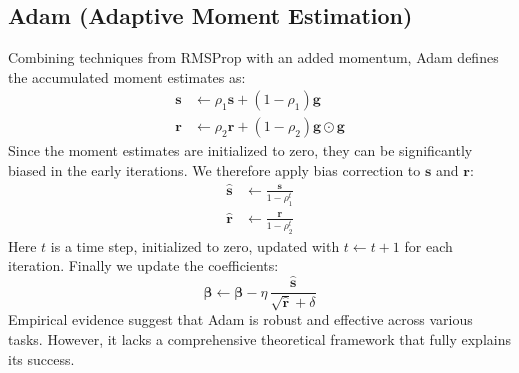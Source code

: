 \documentclass{article}
\begin{document}
\begin{multicols}{2}
\subsection*{Adam (Adaptive Moment Estimation)}
Combining techniques from RMSProp with an added momentum, Adam defines the accumulated moment estimates as:
\begin{align*}
        \bm{s} &\leftarrow \rho_1 \bm{s} + (1 - \rho_1) \bm{g} \\
        \bm{r} &\leftarrow \rho_2 \bm{r} + (1 - \rho_2) \bm{g} \odot \bm{g}
\end{align*}
Since the moment estimates are initialized to zero, they can be significantly biased in the early iterations. We therefore apply bias correction to $\bm{s}$ and $\bm{r}$:
\begin{align*}
    \bm{\hat{s}} &\leftarrow \frac{\bm{s}}{1-\rho_1^t} \\
    \bm{\hat{r}} &\leftarrow \frac{\bm{r}}{1-\rho_2^t}
\end{align*}
Here $t$ is a time step, initialized to zero, updated with $t \leftarrow t + 1$ for each iteration. Finally we update the coefficients:
$$\bm{\beta} \leftarrow \bm{\beta} - \eta \, \frac{\bm{\hat{s}}}{\sqrt{\bm{\hat{r}} } + \delta}
$$
Empirical evidence suggest that Adam is robust and effective across various tasks. However, it lacks a comprehensive theoretical framework that fully explains its success. \cite{goodfellow_deep_2016}


\end{multicols}
\end{document}
